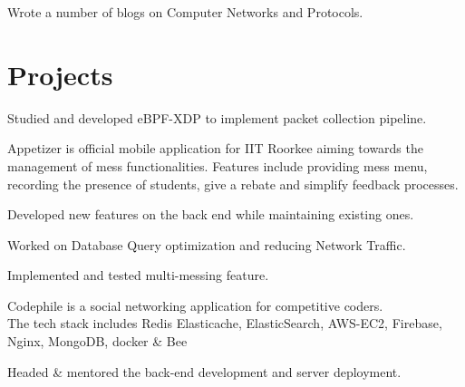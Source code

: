 \documentclass[letterpaper]{deedy-resume} %
\begin{document}
\begin{minipage}[t]{0.66\textwidth}
\sectionspace %

Wrote a number of blogs on Computer Networks and Protocols.


\sectionspace %


\section{Projects} 

\begin{tightitemize}
\item Studied and developed eBPF-XDP to implement packet collection pipeline.
\end{tightitemize}
\sectionspace %

Appetizer is official mobile application for IIT Roorkee aiming towards the management of mess functionalities. Features include providing mess menu, recording the presence of students, give a rebate and simplify feedback processes.
\begin{tightitemize}
\item Developed new features on the back end while maintaining existing ones.
\item Worked on Database Query optimization and reducing Network Traffic.
\item Implemented and tested multi-messing feature.
\end{tightitemize}
\sectionspace %


Codephile is a social networking application for competitive coders.\\
The tech stack includes Redis Elasticache, ElasticSearch, AWS-EC2, Firebase, Nginx, MongoDB, docker \& Bee
\begin{tightitemize}
\item Headed \& mentored the back-end development and server deployment.
\end{tightitemize}
\sectionspace %


\end{minipage}
\end{document}

